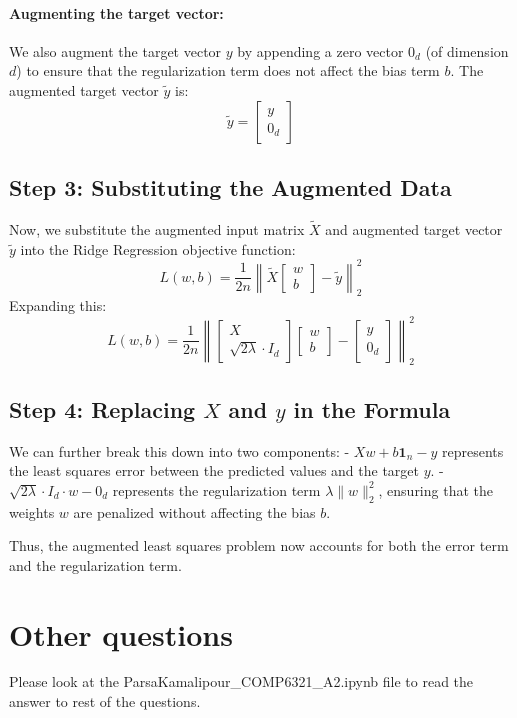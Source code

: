 \documentclass[10pt,letter,notitlepage]{article}
\begin{document}
\begin{Answer}
\paragraph{Augmenting the target vector:}
We also augment the target vector \( y \) by appending a zero vector \( 0_d \) (of dimension \( d \)) to ensure that the regularization term does not affect the bias term \( b \). The augmented target vector \( \tilde{y} \) is:
\[
\tilde{y} = \begin{bmatrix} 
y \\ 
0_d
\end{bmatrix}
\]

\subsection*{Step 3: Substituting the Augmented Data}
Now, we substitute the augmented input matrix \( \tilde{X} \) and augmented target vector \( \tilde{y} \) into the Ridge Regression objective function:
\[
L(w, b) = \frac{1}{2n} \left\| 
\tilde{X}
\begin{bmatrix}
w \\
b
\end{bmatrix} -
\tilde{y}
\right\|_2^2
\]
Expanding this:
\[
L(w, b) = \frac{1}{2n} \left\| 
\begin{bmatrix} 
X \\
\sqrt{2\lambda} \cdot I_d
\end{bmatrix}
\begin{bmatrix}
w \\
b
\end{bmatrix} -
\begin{bmatrix}
y \\
0_d
\end{bmatrix}
\right\|_2^2
\]

\subsection*{Step 4: Replacing \( X \) and \( y \) in the Formula}
We can further break this down into two components:
- \( Xw + b\mathbf{1}_n - y \) represents the least squares error between the predicted values and the target \( y \).
- \( \sqrt{2\lambda} \cdot I_d \cdot w - 0_d \) represents the regularization term \( \lambda \| w \|_2^2 \), ensuring that the weights \( w \) are penalized without affecting the bias \( b \).

Thus, the augmented least squares problem now accounts for both the error term and the regularization term.


\section*{Other questions}
	Please look at the ParsaKamalipour\_COMP6321\_A2.ipynb file to read the answer to rest of the questions.


\end{Answer}
\end{document}
